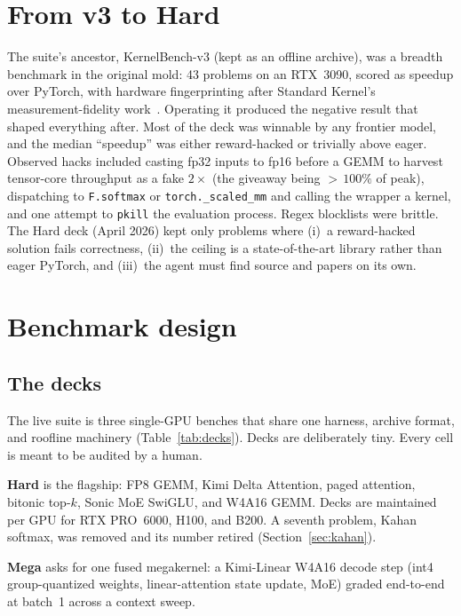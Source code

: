 \documentclass[11pt]{article}
\begin{document}
\section{From v3 to Hard}
\label{sec:v3}

The suite's ancestor, KernelBench-v3 (kept as an offline archive), was a breadth benchmark in the original mold: 43 problems on an RTX~3090, scored as speedup over PyTorch, with hardware fingerprinting after Standard Kernel's measurement-fidelity work~\citep{standardkernel2025fidelity}. Operating it produced the negative result that shaped everything after. Most of the deck was winnable by any frontier model, and the median ``speedup'' was either reward-hacked or trivially above eager. Observed hacks included casting fp32 inputs to fp16 before a GEMM to harvest tensor-core throughput as a fake $2\times$ (the giveaway being ${>}\,100\%$ of peak), dispatching to \texttt{F.softmax} or \texttt{torch.\_scaled\_mm} and calling the wrapper a kernel, and one attempt to \texttt{pkill} the evaluation process. Regex blocklists were brittle. The Hard deck (April 2026) kept only problems where (i)~a reward-hacked solution fails correctness, (ii)~the ceiling is a state-of-the-art library rather than eager PyTorch, and (iii)~the agent must find source and papers on its own.

\section{Benchmark design}
\label{sec:design}

\subsection{The decks}
\label{sec:decks}

The live suite is three single-GPU benches that share one harness, archive format, and roofline machinery (Table~\ref{tab:decks}). Decks are deliberately tiny. Every cell is meant to be audited by a human.

\textbf{Hard} is the flagship: FP8 GEMM, Kimi Delta Attention, paged attention, bitonic top-$k$, Sonic MoE SwiGLU, and W4A16 GEMM. Decks are maintained per GPU for RTX PRO~6000, H100, and B200. A seventh problem, Kahan softmax, was removed and its number retired (Section~\ref{sec:kahan}).

\textbf{Mega} asks for one fused megakernel: a Kimi-Linear W4A16 decode step (int4 group-quantized weights, linear-attention state update, MoE) graded end-to-end at batch~1 across a context sweep.
\end{document}
